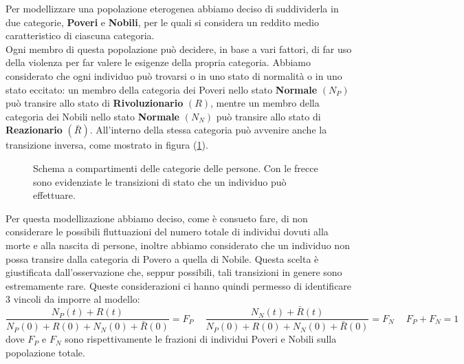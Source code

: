 Per modellizzare una popolazione eterogenea abbiamo deciso di suddividerla in due categorie, \textbf{Poveri} e \textbf{Nobili}, per le quali si considera un reddito medio caratteristico di ciascuna categoria.\\
Ogni membro di questa popolazione può decidere, in base a vari fattori, di far uso della violenza per far valere le esigenze della propria categoria. Abbiamo considerato che ogni individuo può trovarsi o in uno stato di normalità o in uno stato eccitato: un membro della categoria dei Poveri nello stato \textbf{Normale} $(N_P)$ può transire allo stato di \textbf{Rivoluzionario} $(R)$, mentre un membro della categoria dei Nobili nello stato \textbf{Normale} $(N_N)$ può transire allo stato di \textbf{Reazionario} $(\bar{R})$. All'interno della stessa categoria può avvenire anche la transizione inversa, come mostrato in figura (\ref{fig:CompartmentScheme}).\\
\begin{figure}[H]
	\centering
	\label{fig:CompartmentScheme}
	\caption{Schema a compartimenti delle categorie delle persone. Con le frecce sono evidenziate le transizioni di stato che un individuo può effettuare.}
\end{figure}
Per questa modellizazione abbiamo deciso, come è consueto fare, di non  considerare le possibili fluttuazioni del numero totale di individui dovuti alla morte e alla nascita di persone, inoltre abbiamo considerato che un individuo non possa transire dalla categoria di Povero a quella di Nobile. Questa scelta è giustificata dall'osservazione che, seppur possibili, tali transizioni in genere sono estremamente rare. Queste considerazioni ci hanno quindi permesso di identificare 3 vincoli da imporre al modello:
\begin{equation}
    \frac{N_P(t)+R(t)}{N_P(0)+R(0)+N_N(0)+\bar{R}(0)}=F_P \quad\:\frac{N_N(t)+\bar{R}(t)}{N_P(0)+R(0)+N_N(0)+\bar{R}(0)}=F_N \quad\: F_P+F_N=1 
	\label{vincoli}
\end{equation}
dove $F_P$ e $F_N$ sono rispettivamente le frazioni di individui Poveri e Nobili sulla popolazione totale.\\

